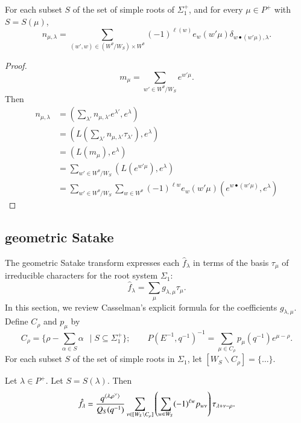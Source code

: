 \begin{lemma}  For each subset $S$ of the set of simple roots of $\Sigma^+_1$,
and for every $\mu\in P^+$ with $S = S(\mu)$,
\[
n_{\mu,\lambda}=\sum_{(w',w)\in (W^\theta/W_S)\times W^\theta} (-1)^{\ell(w)} e_w(w'\mu) \delta_{w\bullet (w'\mu),\lambda}. 
\]
\end{lemma}

\begin{proof}  
\[
m_\mu = \sum_{w'\in W^\theta/W_S} e^{w' \mu}.
\]
Then
\begin{align*}
n_{\mu,\lambda} 
    &= (\sum_{\lambda'} n_{\mu,{\lambda'}} e^{\lambda'},e^\lambda) \\
     &= (L(\sum_{\lambda'} n_{\mu,\lambda'} \tau_{\lambda'}),e^\lambda) \\
     &= (L(m_\mu),e^\lambda) \\
     &= \sum_{w'\in W^\theta/W_S} (L(e^{w'\mu}),e^\lambda)\\
     &= \sum_{w'\in W^\theta/W_S} \sum_{w\in W^\theta} (-1)^{\ell w} e_w(w'\mu) (e^{w\bullet (w'\mu)},e^\lambda)
\end{align*}
\end{proof}

\subsection{geometric Satake}


The geometric Satake transform expresses each $\hat f_\lambda$ in terms of the basis $\tau_\mu$ of irreducible
characters for the root system $\Sigma_1$:
\begin{equation}\label{eqn:geometric-satake}
\hat f_\lambda = \sum_\mu g_{\lambda,\mu} \tau_\mu.
\end{equation}
In this section, we review Casselman's explicit formula for the coefficients $g_{\lambda,\mu}$.
Define $C_\rho$ and $p_\mu$ by
\[
C_\rho = \{ \rho - \sum_{\alpha\in S}\alpha \ \ \mid S \subseteq \Sigma^+_1 \};
\qquad P(E^{-1},q^{-1})^{-1} = \sum_{\mu\in C_\rho} p_\mu(q^{-1}) e^{\mu-\rho}.
\]
For each subset $S$ of the set of simple roots in $\Sigma_1$, let
$[W_S\backslash C_\rho] = \{ \ldots\}$.

\begin{lemma}  Let $\lambda\in P^+$.  Let $S = S(\lambda)$.  Then
\[
\hat f_\lambda = \frac{q^{\langle{\lambda,\rho^\vee}\rangle}}{Q_S(q^{-1})} 
\sum_{\nu\in [W_S\backslash C_\rho]}\left(\sum_{w\in W_S} (-1)^{\ell w} p_{w\nu} \right)  \tau_{\lambda+\nu-\rho}.
\]
\end{lemma}

